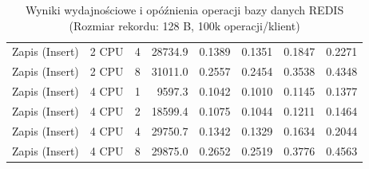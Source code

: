 \begin{table}[ht]
{\begin{tabular}{llcrrrrr}
Zapis (Insert) & 2 CPU & 4 & 28734.9 & 0.1389 & 0.1351 & 0.1847 & 0.2271 \\
Zapis (Insert) & 2 CPU & 8 & 31011.0 & 0.2557 & 0.2454 & 0.3538 & 0.4348 \\
Zapis (Insert) & 4 CPU & 1 & 9597.3 & 0.1042 & 0.1010 & 0.1145 & 0.1377 \\
Zapis (Insert) & 4 CPU & 2 & 18599.4 & 0.1075 & 0.1044 & 0.1211 & 0.1464 \\
Zapis (Insert) & 4 CPU & 4 & 29750.7 & 0.1342 & 0.1329 & 0.1634 & 0.2044 \\
Zapis (Insert) & 4 CPU & 8 & 29875.0 & 0.2652 & 0.2519 & 0.3776 & 0.4563 \\
\bottomrule
\end{tabular}%
}
\caption{Wyniki wydajnościowe i opóźnienia operacji bazy danych REDIS (Rozmiar rekordu: 128 B, 100k operacji/klient)}
\label{tab:latency_redis_small_100000}
\end{table}

